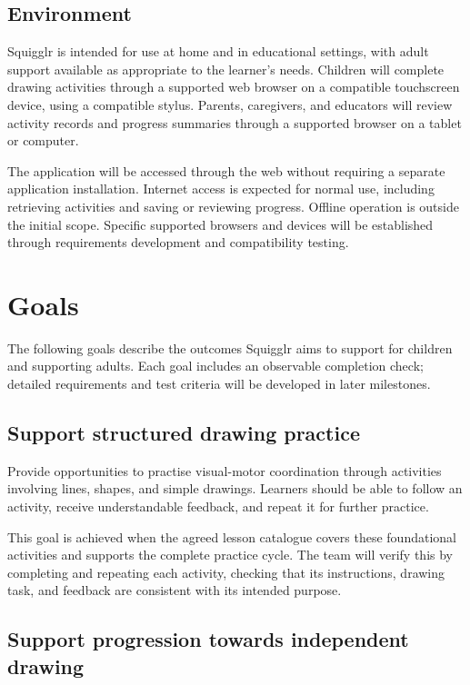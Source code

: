 \documentclass{article}
\begin{document}
\subsection{Environment}

Squigglr is intended for use at home and in educational settings, with
adult support available as appropriate to the learner's needs. Children
will complete drawing activities through a supported web browser on a
compatible touchscreen device, using a compatible stylus.
Parents, caregivers, and educators will review activity records and
progress summaries through a supported browser on a tablet or computer.

The application will be accessed through the web without requiring a
separate application installation. Internet access is expected for
normal use, including retrieving activities and saving or reviewing
progress. Offline operation is outside the initial scope. Specific
supported browsers and devices will be established through requirements
development and compatibility testing.

\section{Goals}
\renewcommand{\thesubsection}{G.\arabic{subsection}}

The following goals describe the outcomes Squigglr aims to support for
children and supporting adults. Each goal includes an observable
completion check; detailed requirements and test criteria will be
developed in later milestones.

\subsection{Support structured drawing practice}

Provide opportunities to practise visual-motor coordination through
activities involving lines, shapes, and simple drawings. Learners
should be able to follow an activity, receive understandable feedback,
and repeat it for further practice.

This goal is achieved when the agreed lesson catalogue covers these
foundational activities and supports the complete practice cycle.
The team will verify this by completing and repeating each activity,
checking that its instructions, drawing task, and feedback are
consistent with its intended purpose.


\subsection{Support progression towards independent drawing}
\end{document}
